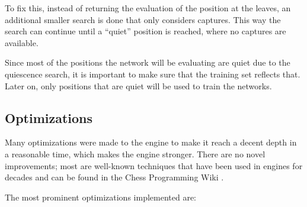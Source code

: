 To fix this, instead of returning the evaluation of the position at the leaves, an additional smaller search is done that only considers captures. This way the search can continue until a \enquote{quiet} position is reached, where no captures are available.

Since most of the positions the network will be evaluating are quiet due to the quiescence search, it is important to make sure that the training set reflects that. Later on, only positions that are quiet will be used to train the networks.

\newpage
\subsection{Optimizations}

Many optimizations were made to the engine to make it reach a decent depth in a reasonable time, which makes the engine stronger. There are no novel improvements; most are well-known techniques that have been used in engines for decades and can be found in the Chess Programming Wiki \cite{cpw}.

The most prominent optimizations implemented are:

